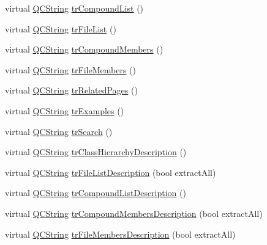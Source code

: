 \begin{DoxyCompactItemize}
\item 
virtual \mbox{\hyperlink{class_q_c_string}{Q\+C\+String}} \mbox{\hyperlink{class_translator_chinesetraditional_ab08d522825cf6d53f1f1c19bc8f4a3b5}{tr\+Compound\+List}} ()
\item 
virtual \mbox{\hyperlink{class_q_c_string}{Q\+C\+String}} \mbox{\hyperlink{class_translator_chinesetraditional_a1b1a43ae6c4c90d95b8d32f3be8c867e}{tr\+File\+List}} ()
\item 
virtual \mbox{\hyperlink{class_q_c_string}{Q\+C\+String}} \mbox{\hyperlink{class_translator_chinesetraditional_aff1bc2d63df22b6b462c4ff59e23366d}{tr\+Compound\+Members}} ()
\item 
virtual \mbox{\hyperlink{class_q_c_string}{Q\+C\+String}} \mbox{\hyperlink{class_translator_chinesetraditional_ad0cd759b12e0438aa93db58352555760}{tr\+File\+Members}} ()
\item 
virtual \mbox{\hyperlink{class_q_c_string}{Q\+C\+String}} \mbox{\hyperlink{class_translator_chinesetraditional_a56b731c25ed22e469f9208ab8bef48ca}{tr\+Related\+Pages}} ()
\item 
virtual \mbox{\hyperlink{class_q_c_string}{Q\+C\+String}} \mbox{\hyperlink{class_translator_chinesetraditional_a538d7aac5d4193d83cf4495b9138ba8e}{tr\+Examples}} ()
\item 
virtual \mbox{\hyperlink{class_q_c_string}{Q\+C\+String}} \mbox{\hyperlink{class_translator_chinesetraditional_ae3af377f58ca738dfeb56712ab26bf7f}{tr\+Search}} ()
\item 
virtual \mbox{\hyperlink{class_q_c_string}{Q\+C\+String}} \mbox{\hyperlink{class_translator_chinesetraditional_aba1f0ee51ae8b31443664d66d88f9b0e}{tr\+Class\+Hierarchy\+Description}} ()
\item 
virtual \mbox{\hyperlink{class_q_c_string}{Q\+C\+String}} \mbox{\hyperlink{class_translator_chinesetraditional_aa34262ed886cea267620f0ebb7fcb153}{tr\+File\+List\+Description}} (bool extract\+All)
\item 
virtual \mbox{\hyperlink{class_q_c_string}{Q\+C\+String}} \mbox{\hyperlink{class_translator_chinesetraditional_a8a8e007367fd06cca98c81ddf4a430b0}{tr\+Compound\+List\+Description}} ()
\item 
virtual \mbox{\hyperlink{class_q_c_string}{Q\+C\+String}} \mbox{\hyperlink{class_translator_chinesetraditional_ae46a126dc342120850c389eef0b8142d}{tr\+Compound\+Members\+Description}} (bool extract\+All)
\item 
virtual \mbox{\hyperlink{class_q_c_string}{Q\+C\+String}} \mbox{\hyperlink{class_translator_chinesetraditional_a2a6653d648b8d2143da0089c6560fa02}{tr\+File\+Members\+Description}} (bool extract\+All)

\end{DoxyCompactItemize}
